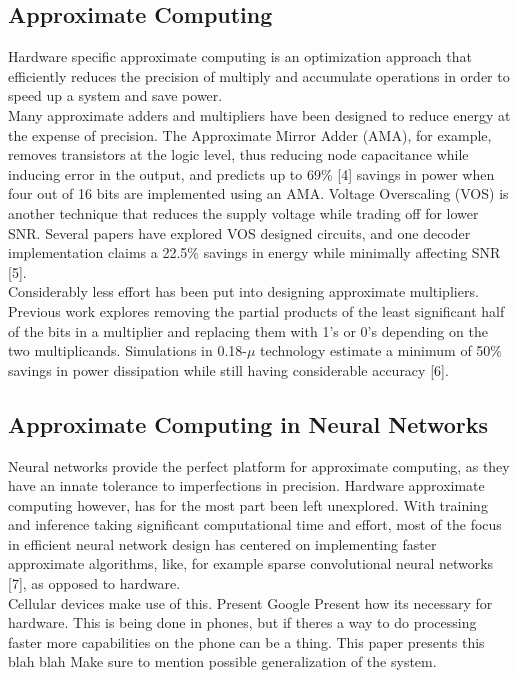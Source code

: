 \documentclass[conference]{IEEEtran}
\begin{document}
\subsection{Approximate Computing}
	Hardware specific approximate computing is an optimization approach that efficiently reduces the precision of multiply and accumulate operations in order to speed up a system and save power. \\
	\indent Many approximate adders and multipliers have been designed to reduce energy at the expense of precision. The Approximate Mirror Adder (AMA), for example, removes transistors at the logic level, thus reducing node capacitance while inducing error in the output, and predicts up to 69\% [4] savings in power when four out of 16 bits are implemented using an AMA. Voltage Overscaling (VOS) is another technique that reduces the supply voltage while trading off for lower SNR. Several papers have explored VOS designed circuits, and one decoder implementation claims a 22.5\% savings in energy while minimally affecting SNR [5]. \\
	\indent Considerably less effort has been put into designing approximate multipliers. Previous work explores removing the partial products of the least significant half of the bits in a multiplier and replacing them with 1's or 0's depending on the two multiplicands. Simulations in 0.18-$\mu$ technology estimate a minimum of 50\% savings in power dissipation while still having considerable accuracy [6].


\subsection{Approximate Computing in Neural Networks}
	Neural networks provide the perfect platform for approximate computing, as they have an innate tolerance to imperfections in precision. Hardware approximate computing however, has for the most part been left unexplored. With training and inference taking significant computational time and effort, most of the focus in efficient neural network design has centered on implementing faster approximate algorithms, like, for example sparse convolutional neural networks [7], as opposed to hardware.\\
	\indent Cellular devices make use of this. Present Google  
	Present how its necessary for hardware. This is being done in phones, but if theres a way to do processing faster more capabilities on the phone can be a thing.
	This paper presents this blah blah 
	Make sure to mention possible generalization of the system. 
	
\end{document}
